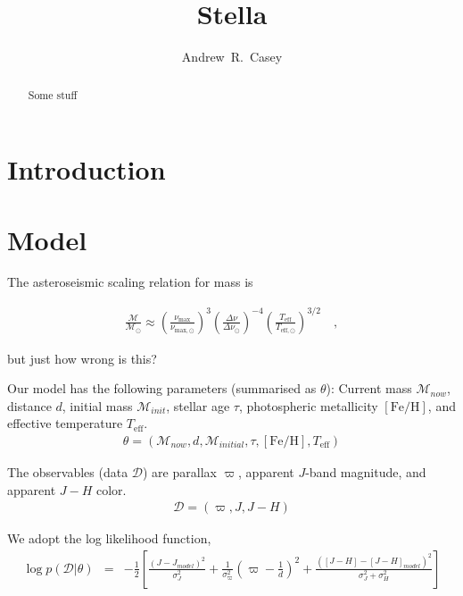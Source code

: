 \documentclass[preprint]{aastex}
\newcommand{\teff}{T_{\mathrm{eff}}}
\newcommand{\teffSolar}{T_{\mathrm{eff},\odot}}
\newcommand{\feh}{[\mathrm{Fe/H}]}
\newcommand{\parallax}{\varpi}
\newcommand{\mass}{\mathcal{M}}
\newcommand{\massSolar}{\mass_\odot}
\newcommand{\numax}{\nu_\mathrm{max}}
\newcommand{\numaxSolar}{\nu_{\mathrm{max},\odot}}
\newcommand{\deltanu}{\Delta\nu}
\newcommand{\deltanuSolar}{\deltanu_\odot}
\newcommand{\age}{\tau}
\newcommand{\given}{|}
\newcommand{\data}{\mathcal{D}}
\begin{document}
\title{Stella}

\author{
  Andrew~R.~Casey
}


\begin{abstract}
  Some stuff
\end{abstract}




\section{Introduction} 
\label{sec:introduction}



\section{Model}
\label{sec:model}

The asteroseismic scaling relation for mass is

\begin{eqnarray}\label{eq:mass-scaling-relation}
    \frac{\mass}{\massSolar} \approx \left(\frac{\numax}{\numaxSolar}\right)^{3}\left(\frac{\deltanu}{\deltanuSolar}\right)^{-4}\left(\frac{\teff}{\teffSolar}\right)^{3/2}  \quad ,
\end{eqnarray}

\noindent{}but just how wrong is this?

Our model has the following parameters (summarised as $\theta$): Current mass $\mass_{now}$, distance $d$, initial mass $\mass_{init}$, stellar age $\age$, photospheric metallicity $\feh$, and effective temperature $\teff$.
\begin{eqnarray}\label{eq:model-parameters}
    \theta = (\mass_{now}, d, \mass_{initial}, \tau, \feh, \teff)
\end{eqnarray}

The observables (data $\data$) are parallax $\parallax$, apparent $J$-band magnitude, and apparent $J-H$ color.
\begin{eqnarray}\label{eq:data}
    \data = (\parallax, J, J-H)
\end{eqnarray}

We adopt the log likelihood function,
\begin{eqnarray}
    \log{p\left(\data\given\theta\right)} & = & -\frac{1}{2}\left[\frac{(J-J_{model})^2}{\sigma_{J}^2} + \frac{1}{\sigma_\parallax^2}\left(\parallax - \frac{1}{d}\right)^2 + \frac{\left([J-H] - [J-H]_{model}\right)^2}{\sigma_J^2 + \sigma_H^2}\right] 
\end{eqnarray}
\end{document}
